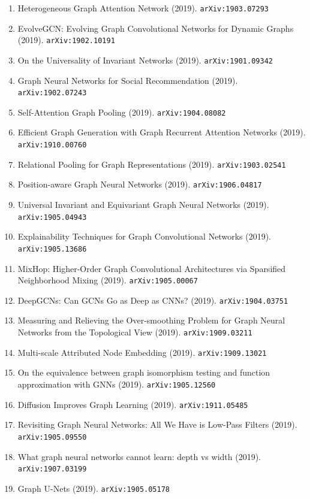 \documentclass[11pt]{article}
\begin{document}
\begin{enumerate}
  Classification (2019). \texttt{arXiv:1905.10947}
  \item Heterogeneous Graph Attention Network (2019). \texttt{arXiv:1903.07293}
  \item EvolveGCN: Evolving Graph Convolutional Networks for Dynamic Graphs (2019). \texttt{arXiv:1902.10191}
  \item On the Universality of Invariant Networks (2019). \texttt{arXiv:1901.09342}
  \item Graph Neural Networks for Social Recommendation (2019). \texttt{arXiv:1902.07243}
  \item Self-Attention Graph Pooling (2019). \texttt{arXiv:1904.08082}
  \item Efficient Graph Generation with Graph Recurrent Attention Networks (2019). \texttt{arXiv:1910.00760}
  \item Relational Pooling for Graph Representations (2019). \texttt{arXiv:1903.02541}
  \item Position-aware Graph Neural Networks (2019). \texttt{arXiv:1906.04817}
  \item Universal Invariant and Equivariant Graph Neural Networks (2019). \texttt{arXiv:1905.04943}
  \item Explainability Techniques for Graph Convolutional Networks (2019). \texttt{arXiv:1905.13686}
  \item MixHop: Higher-Order Graph Convolutional Architectures via Sparsified
  Neighborhood Mixing (2019). \texttt{arXiv:1905.00067}
  \item DeepGCNs: Can GCNs Go as Deep as CNNs? (2019). \texttt{arXiv:1904.03751}
  \item Measuring and Relieving the Over-smoothing Problem for Graph Neural
  Networks from the Topological View (2019). \texttt{arXiv:1909.03211}
  \item Multi-scale Attributed Node Embedding (2019). \texttt{arXiv:1909.13021}
  \item On the equivalence between graph isomorphism testing and function
  approximation with GNNs (2019). \texttt{arXiv:1905.12560}
  \item Diffusion Improves Graph Learning (2019). \texttt{arXiv:1911.05485}
  \item Revisiting Graph Neural Networks: All We Have is Low-Pass Filters (2019). \texttt{arXiv:1905.09550}
  \item What graph neural networks cannot learn: depth vs width (2019). \texttt{arXiv:1907.03199}
  \item Graph U-Nets (2019). \texttt{arXiv:1905.05178}

\end{enumerate}
\end{document}
